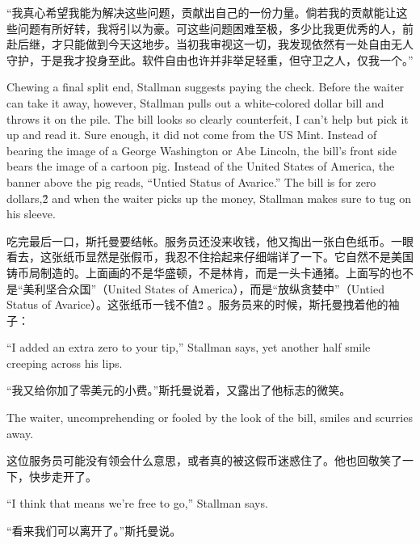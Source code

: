 \ifdefined\chs
``我真心希望我能为解决这些问题，贡献出自己的一份力量。倘若我的贡献能让这些问题有所好转，我将引以为豪。可这些问题困难至极，多少比我更优秀的人，前赴后继，才只能做到今天这地步。当初我审视这一切，我发现依然有一处自由无人守护，于是我才投身至此。软件自由也许并非举足轻重，但守卫之人，仅我一个。''
\fi

\ifdefined\eng
Chewing a final split end, Stallman suggests paying the check. Before the waiter can take it away, however, Stallman pulls out a white-colored dollar bill and throws it on the pile. The bill looks so clearly counterfeit, I can't help but pick it up and read it. Sure enough, it did not come from the US Mint. Instead of bearing the image of a George Washington or Abe Lincoln, the bill's front side bears the image of a cartoon pig. Instead of the United States of America, the banner above the pig reads, ``Untied Status of Avarice.'' The bill is for zero dollars,\ifdefined\v2  \fi and when the waiter picks up the money, Stallman makes sure to tug on his sleeve.
\fi

\ifdefined\chs
吃完最后一口，斯托曼要结帐。服务员还没来收钱，他又掏出一张白色纸币。一眼看去，这张纸币显然是张假币，我忍不住拾起来仔细端详了一下。它自然不是美国铸币局制造的。上面画的不是华盛顿，不是林肯，而是一头卡通猪。上面写的也不是``美利坚合众国''（United States of America），而是``放纵贪婪中''（Untied Status of Avarice）。这张纸币一钱不值\ifdefined\v2 。\fi 服务员来的时候，斯托曼拽着他的袖子：
\fi

\ifdefined\eng
``I added an extra zero to your tip,'' Stallman says, yet another half smile creeping across his lips.
\fi

\ifdefined\chs
``我又给你加了零美元的小费。''斯托曼说着，又露出了他标志的微笑。
\fi

\ifdefined\eng
The waiter, uncomprehending or fooled by the look of the bill, smiles and scurries away.
\fi

\ifdefined\chs
这位服务员可能没有领会什么意思，或者真的被这假币迷惑住了。他也回敬笑了一下，快步走开了。
\fi

\ifdefined\eng
``I think that means we're free to go,'' Stallman says.
\fi

\ifdefined\chs
``看来我们可以离开了。''斯托曼说。
\fi

\theendnotes
\setcounter{endnote}{0}
